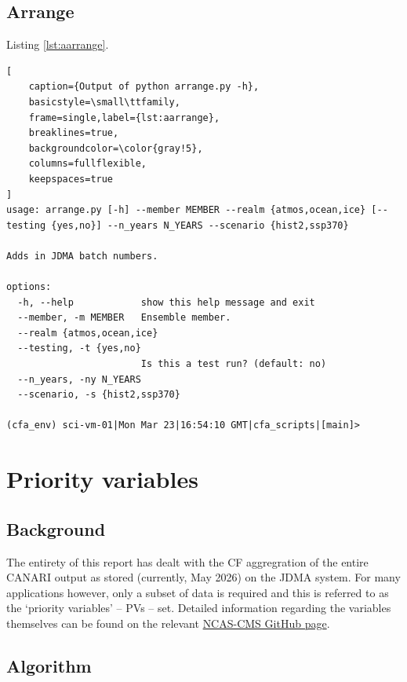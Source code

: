 \documentclass[11pt,a4paper]{article}
\begin{document}
\subsection{Arrange}

Listing \ref{lst:aarrange}.

\begin{minipage}{\textwidth}
\begin{lstlisting}[
    caption={Output of python arrange.py -h},
    basicstyle=\small\ttfamily,
    frame=single,label={lst:aarrange},
    breaklines=true,
    backgroundcolor=\color{gray!5},
    columns=fullflexible,
    keepspaces=true
]
usage: arrange.py [-h] --member MEMBER --realm {atmos,ocean,ice} [--testing {yes,no}] --n_years N_YEARS --scenario {hist2,ssp370}

Adds in JDMA batch numbers.

options:
  -h, --help            show this help message and exit
  --member, -m MEMBER   Ensemble member.
  --realm {atmos,ocean,ice}
  --testing, -t {yes,no}
                        Is this a test run? (default: no)
  --n_years, -ny N_YEARS
  --scenario, -s {hist2,ssp370}

(cfa_env) sci-vm-01|Mon Mar 23|16:54:10 GMT|cfa_scripts|[main]> 
\end{lstlisting}
\end{minipage}


\section{Priority variables}


\subsection{Background}

The entirety of this report has dealt with the CF aggregration of the entire CANARI output as stored (currently, May 2026) on the JDMA system. For many applications however, only a subset of data is required and this is referred to as the `priority variables' -- PVs --  set. Detailed information regarding the variables themselves can be found on the relevant \href{https://ncas-cms.github.io/canari-data/#priority-and-derived-output-on-jasmin-canari-group-workspace}{NCAS-CMS GitHub page}.

\subsection{Algorithm}
\end{document}
